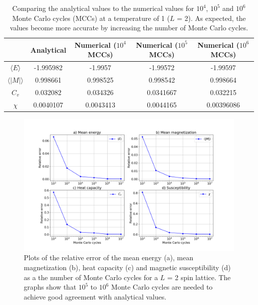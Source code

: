 \documentclass[10pt,a4paper,titlepage]{article}
\begin{document}
\begin{table}[ht!]
\centering
\caption{Comparing the analytical values to the numerical values for $10^4$, $10^5$ and $10^6$ Monte Carlo cycles (MCCs) at a temperature of 1 ($L$ = 2). As expected, the values become more accurate by increasing the number of Monte Carlo cycles.  } \label{tab:num_vs_ana}
\begin{tabular}{| c | c | c | c | c |} \hline
 & \textbf{Analytical} & \textbf{Numerical ($10^4$ MCCs)} & \textbf{Numerical ($10^5$ MCCs)} & \textbf{Numerical ($10^6$ MCCs)} \\ \hline
$\langle E \rangle$ & -1.995982 & -1.9957 & -1.99572 & -1.99597\\ \hline
$\langle |M| \rangle$ & 0.998661 & 0.998525 & 0.998542 & 0.998664\\ \hline
$C_v$ & 0.032082 & 0.034326 &0.0341667 & 0.032215\\ \hline
$\chi$ & 0.0040107 & 0.0043413 & 0.0044165& 0.00396086\\ \hline

\end{tabular}
\end{table}

\begin{figure}[]
\centering
\centering\includegraphics[scale=0.3]{relerr_T10.png}
\caption{Plots of the relative error of the mean energy (a), mean magnetization (b), heat capacity (c) and magnetic susceptibility (d) as a the number of Monte Carlo cycles for a $L$ = 2 spin lattice. The graphs show that $10^5$ to $10^6$ Monte Carlo cycles are needed to achieve good agreement with analytical values.  \label{fig:b_rel_err}}
\end{figure}
\end{document}

